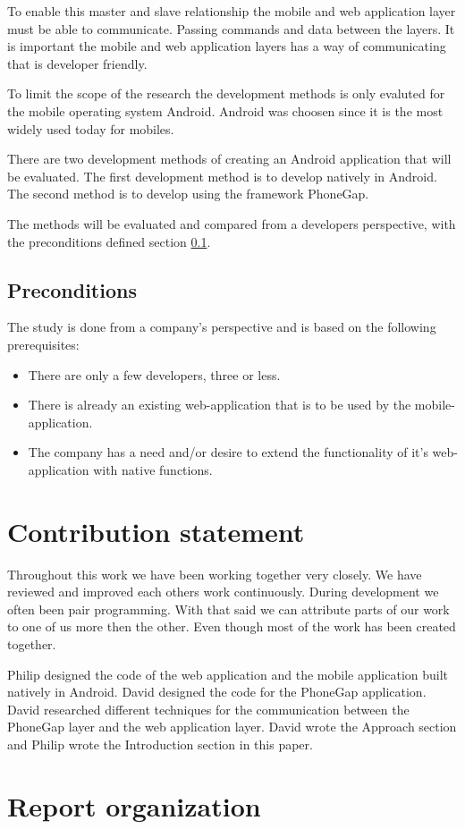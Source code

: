 To enable this master and slave relationship the mobile and web application layer must be able to communicate. Passing commands and data between the layers. It is important the mobile and web application layers has a way of communicating that is developer friendly. 

To limit the scope of the research the development methods is only evaluted for the mobile operating system Android. Android was choosen since it is the most widely used today for mobiles.

There are two development methods of creating an Android application that will be evaluated. The first development method is to develop natively in Android. The second method is to develop using the framework PhoneGap.

The methods will be evaluated and compared from a developers perspective, with the preconditions defined section \ref{section-preconditions}.

\subsection{Preconditions} \label{section-preconditions}
The study is done from a company's perspective and is based on the following prerequisites:
\begin{itemize}
\item There are only a few developers, three or less.
\item There is already an existing web-application that is to be used by the mobile-application.
\item The company has a need and/or desire to extend the functionality of it's web-application with native functions.
\end{itemize}

\section{Contribution statement}
Throughout this work we have been working together very closely. We have reviewed and improved each others work continuously. During development we often been pair programming. With that said we can attribute parts of our work to one of us more then the other. Even though most of the work has been created together. 

Philip designed the code of the web application and the mobile application built natively in Android. David designed the code for the PhoneGap application. David researched different techniques for the communication between the PhoneGap layer and the web application layer. David wrote the Approach section and Philip wrote the Introduction section in this paper. 


\section{Report organization}
